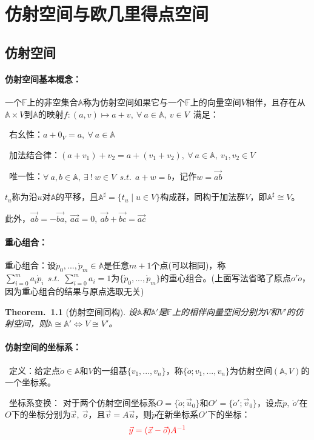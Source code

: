 \documentclass[zihao=5,UTF8]{report}
\def\F{\mathbb{F}}
\def\A{\mathbb{A}}
\theoremstyle{mystyle} %
\newtheorem{theorem}{Theorem.\,}
\begin{document}
\chapter{仿射空间与欧几里得点空间}\thispagestyle{fancy} 

\section{仿射空间}
\subsubsection{仿射空间基本概念：}
一个$\F$上的非空集合$\A$称为仿射空间如果它与一个$\F$上的向量空间$V$相伴，且存在从$\A\times V$到$\A$的映射$f:(a,v) \longmapsto a+v,\ \forall\ a\in \A,\ v\in V$\ 满足：
\par{}\ 右幺性：$a+0_{V} = a,\ \forall\ a\in \A$\par
{}\  加法结合律：$(a+v_1)+v_2 = a+(v_1+v_2),\ \forall\ a\in \A,\ v_1,v_2\in V$   \par
{}\  唯一性：$\forall\ a,b\in \A,\ \exists\ !\ w \in V\ \ s.t.\ \ a+w=b$，记作$w = \overrightarrow{ab}  $ \par

$t_u$称为沿$u$对$\A$的平移，且$\A^{\sharp } = \{t_u\mid u\in V\}$构成群，同构于加法群$V$，即$\A^{\sharp } \cong V$。

此外，$\overrightarrow{ab} = -\overrightarrow{ba},\ \overrightarrow{aa}=0,\  \overrightarrow{ab}+ \overrightarrow{bc} =  \overrightarrow{ac}$

\subsubsection{重心组合：}
重心组合：设$\dot{p}_0,...,\dot{p}_m \in \A$是任意$m+1$个点(可以相同)，称$\sum_{i=0}^{m}a_i\dot{p}_i\ \ s.t.\ \ \sum_{i=0}^{m}a_i = 1  $为$\{\dot{p}_0,...,\dot{p}_m \}$的重心组合。(上面写法省略了原点$o'\dot{o}$，因为重心组合的结果与原点选取无关) 

\begin{theorem}[仿射空间同构]\label{仿射空间同构}
设$\A$和$\A'$是$\F$上的相伴向量空间分别为$V$和$V'$的仿射空间，则$\A\cong\A' \Longleftrightarrow V \cong V' $。
\end{theorem}


\subsubsection{仿射空间的坐标系：}
\par{}\ 定义：给定点$\dot{o}\in \A$和$V$的一组基$\{v_1,...,v_n\}$，称$\{\dot{o};v_1,...,v_n\}$为仿射空间$(\A,V)$的一个坐标系。
\par
{}\  坐标系变换： 
对于两个仿射空间坐标系$O = \{\dot{o};\vec{u}_0\}$和$O' = \{\dot{o}';\vec{v}_0\}$，设点$\dot{p},\ \dot{o}'$在$O$下的坐标分别为$\vec{x},\ \vec{o}$，且$\vec{v} = A\vec{u}$，则$\dot{p}$在新坐标系$O'$下的坐标：
\begin{equation*}
    \textcolor{red}{\vec{y} = (\vec{x} - \vec{o})A^{-1}}
\end{equation*}
\par
\end{document}
